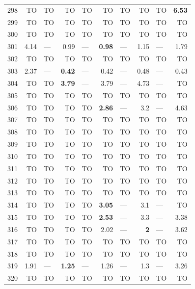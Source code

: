 \begin{longtable}{lr@{\hskip 4pt}l@{\hskip 12pt}r@{\hskip 4pt}l@{\hskip 12pt}r@{\hskip 4pt}l@{\hskip 12pt}r@{\hskip 4pt}l@{\hskip 12pt}r}
298 & TO & TO & TO & TO & TO & TO & TO & TO & \textbf{6.53} \\
299 & TO & TO & TO & TO & TO & TO & TO & TO & TO \\
300 & TO & TO & TO & TO & TO & TO & TO & TO & TO \\
301 & 4.14 & --- & 0.99 & --- & \textbf{0.98} & --- & 1.15 & --- & 1.79 \\
302 & TO & TO & TO & TO & TO & TO & TO & TO & TO \\
303 & 2.37 & --- & \textbf{0.42} & --- & 0.42 & --- & 0.48 & --- & 0.43 \\
304 & TO & TO & \textbf{3.79} & --- & 3.79 & --- & 4.73 & --- & TO \\
305 & TO & TO & TO & TO & TO & TO & TO & TO & TO \\
306 & TO & TO & TO & TO & \textbf{2.86} & --- & 3.2 & --- & 4.63 \\
307 & TO & TO & TO & TO & TO & TO & TO & TO & TO \\
308 & TO & TO & TO & TO & TO & TO & TO & TO & TO \\
309 & TO & TO & TO & TO & TO & TO & TO & TO & TO \\
310 & TO & TO & TO & TO & TO & TO & TO & TO & TO \\
311 & TO & TO & TO & TO & TO & TO & TO & TO & TO \\
312 & TO & TO & TO & TO & TO & TO & TO & TO & TO \\
313 & TO & TO & TO & TO & TO & TO & TO & TO & TO \\
314 & TO & TO & TO & TO & \textbf{3.05} & --- & 3.1 & --- & TO \\
315 & TO & TO & TO & TO & \textbf{2.53} & --- & 3.3 & --- & 3.38 \\
316 & TO & TO & TO & TO & 2.02 & --- & \textbf{2} & --- & 3.62 \\
317 & TO & TO & TO & TO & TO & TO & TO & TO & TO \\
318 & TO & TO & TO & TO & TO & TO & TO & TO & TO \\
319 & 1.91 & --- & \textbf{1.25} & --- & 1.26 & --- & 1.3 & --- & 3.26 \\
320 & TO & TO & TO & TO & TO & TO & TO & TO & TO \\
\bottomrule
\end{longtable}